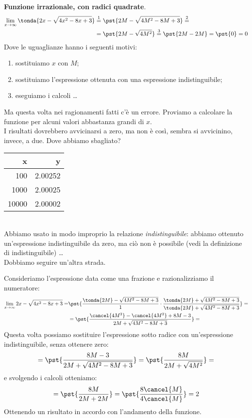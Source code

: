 \begin{esempio}
\textbf{Funzione irrazionale, con radici quadrate}.
\begin{align*}
\lim_{x \rightarrow \infty} \tonda{2x-\sqrt{4x^2-8x+3}} & \stackrel{1}{=} 
  \pst{2M-\sqrt{4M^2-8M+3}} \stackrel{2}{=} \\
  &=\pst{2M-\sqrt{4M^2}} \stackrel{3}{=} 
  \pst{2M-2M} = \pst{0} = 0
\end{align*}
Dove le uguaglianze hanno i seguenti motivi:
\begin{enumerate} [nosep]
 \item sostituiamo \(x\) con \(M\);
 \item sostituiamo l'espressione ottenuta con una espressione 
   indistinguibile;
 \item eseguiamo i calcoli \dots
\end{enumerate}
\vspace{1em}
\begin{minipage}{.69\textwidth}
Ma questa volta nei ragionamenti fatti c'è un errore. Proviamo a calcolare 
la funzione per alcuni valori abbastanza grandi di \(x\).\\
I risultati dovrebbero avvicinarsi a zero, ma non è così, sembra si 
avvicinino, invece, a due. Dove abbiamo sbagliato?
\end{minipage}
\begin{minipage}{.39\textwidth}
\begin{center}
\begin{tabular}{r|r}
x & y\\\hline
100 & 2.00252 \\
1000 & 2.00025 \\
10000 & 2.00002 \\
\end{tabular}
\end{center}
\end{minipage}\\

Abbiamo usato in modo improprio la relazione \emph{indistinguibile}: 
abbiamo ottenuto un'espressione indistinguibile da zero, ma ciò non è 
possibile (vedi la definizione di indistinguibile) \dots \\
Dobbiamo seguire un'altra strada.

Consideriamo l'espressione data come una frazione e razionalizziamo il 
numeratore:
\begin{align*}
\lim_{x \rightarrow \infty} 2x-\sqrt{4x^2-8x+3}=
&\pst{\frac{\tonda{2M}-\sqrt{4M^2-8M+3}}{1} \cdot 
\frac{\tonda{2M}+\sqrt{4M^2-8M+3}}{\tonda{2M}+\sqrt{4M^2-8M+3}}}=\\
&=\pst{\frac{\cancel{4M^2}-\cancel{4M^2}+8M-3}{2M+\sqrt{4M^2-8M+3}}}=
\end{align*}
Questa volta possiamo sostituire l'espressione sotto radice con 
un'espressione indistinguibile, senza ottenere zero:
\[=\pst{\frac{8M-3}{2M+\sqrt{4M^2-8M+3}}} =
   \pst{\frac{8M}{2M+\sqrt{4M^2}}}=\]
e svolgendo i calcoli otteniamo:
\[=\pst{\frac{8M}{2M+2M}}=
   \pst{\frac{8\cancel{M}}{4\cancel{M}}} = 2\]
Ottenendo un risultato in accordo con l'andamento della funzione.
\end{esempio}

